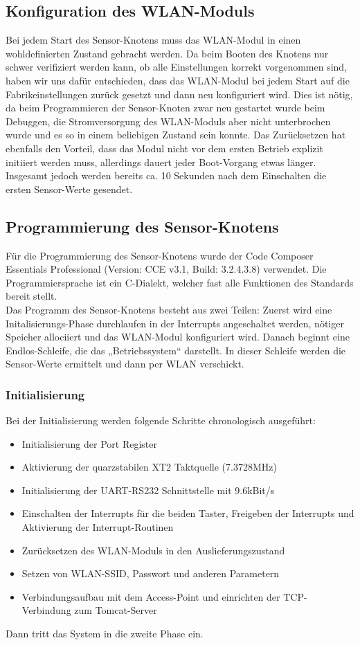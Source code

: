 \documentclass[12pt,a4paper,twoside]{article}
\begin{document}
\subsection{Konfiguration des WLAN-Moduls}
Bei jedem Start des Sensor-Knotens muss das WLAN-Modul in einen wohldefinierten Zustand gebracht werden. Da beim Booten des Knotens nur schwer verifiziert werden kann, 
ob alle Einstellungen korrekt vorgenommen sind, haben wir uns dafür entschieden, dass das WLAN-Modul bei jedem Start auf die Fabrikeinstellungen  zurück gesetzt und dann neu konfiguriert wird. 
Dies ist nötig, da beim Programmieren der Sensor-Knoten zwar neu gestartet wurde beim Debuggen, die Stromversorgung des WLAN-Moduls aber nicht unterbrochen wurde und es so in einem beliebigen Zustand sein konnte. 
Das Zurücksetzen hat ebenfalls den Vorteil, dass das Modul nicht vor dem ersten Betrieb explizit initiiert werden muss, allerdings dauert jeder Boot-Vorgang etwas länger. Insgesamt jedoch werden bereits ca. 10 Sekunden nach dem Einschalten die ersten Sensor-Werte gesendet. 


\subsection{Programmierung des Sensor-Knotens}
Für die Programmierung des Sensor-Knotens wurde der Code Composer Essentials Professional (Version: CCE v3.1, Build: 3.2.4.3.8)  verwendet. Die Programmiersprache ist ein C-Dialekt, welcher fast alle Funktionen des Standards bereit stellt. \\
Das Programm des Sensor-Knotens besteht aus zwei Teilen: Zuerst wird eine Initalisierungs-Phase durchlaufen in der Interrupts angeschaltet werden, nötiger Speicher allociiert und das WLAN-Modul konfiguriert wird. Danach beginnt eine Endlos-Schleife, die das „Betriebssystem“ darstellt. 
In dieser Schleife werden die Sensor-Werte ermittelt und dann per WLAN verschickt.

\subsubsection{Initialisierung}
Bei der Initialisierung werden folgende Schritte chronologisch ausgeführt: 

\begin{itemize}
 \item Initialisierung der Port Register
 \item Aktivierung der quarzstabilen XT2 Taktquelle (7.3728MHz)
 \item Initialisierung der UART-RS232 Schnittstelle mit 9.6kBit/s
 \item Einschalten der Interrupts für die beiden Taster, Freigeben der Interrupts und  Aktivierung der Interrupt-Routinen
 \item Zurücksetzen des WLAN-Moduls in den Auslieferungszustand
 \item Setzen von WLAN-SSID, Passwort und anderen Parametern
 \item Verbindungsaufbau mit dem Access-Point und einrichten der TCP-Verbindung zum Tomcat-Server
\end{itemize}
Dann tritt das System in die zweite Phase ein.
\end{document}
